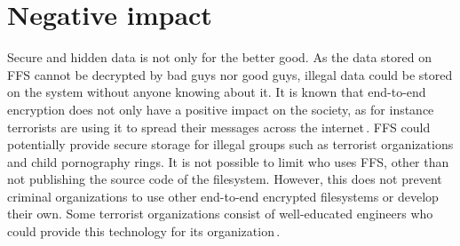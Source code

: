 \section{Negative impact}
Secure and hidden data is not only for the better good. As the data stored on FFS cannot be decrypted by bad guys nor good guys, illegal data could be stored on the system without anyone knowing about it. It is known that end-to-end encryption does not only have a positive impact on the society, as for instance terrorists are using it to spread their messages across the internet\,\cite{ruddEncryptionCounterterrorismGetting2017}. FFS could potentially provide secure storage for illegal groups such as terrorist organizations and child pornography rings. It is not possible to limit who uses FFS, other than not publishing the source code of the filesystem. However, this does not prevent criminal organizations to use other end-to-end encrypted filesystems or develop their own. Some terrorist organizations consist of well-educated engineers who could provide this technology for its organization\,\cite{berrebyEngineeringTerror2010}.